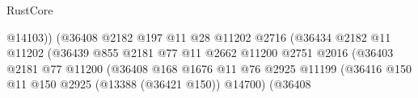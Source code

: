 \begin{lexlean}{RustCore}
\begin{coremodule}
                                                        @14103))
                                                    (@36408
                                                      @2182
                                                      @197
                                                      @11
                                                      @28
                                                      @11202
                                                      @2716
                                                      (@36434
                                                        @2182
                                                        @11
                                                        @11202
                                                        (@36439
                                                          @855
                                                          @2181
                                                          @77
                                                          @11
                                                          @2662
                                                          @11200
                                                          @2751
                                                          @2016
                                                          (@36403
                                                            @2181
                                                            @77
                                                            @11200
                                                            (@36408
                                                              @168
                                                              @1676
                                                              @11
                                                              @76
                                                              @2925
                                                              @11199
                                                              (@36416
                                                                @150
                                                                @11
                                                                @150
                                                                @2925
                                                                (@13388 (@36421 @150))
                                                                @14700)
                                                              (@36408

\end{coremodule}
\end{lexlean}
